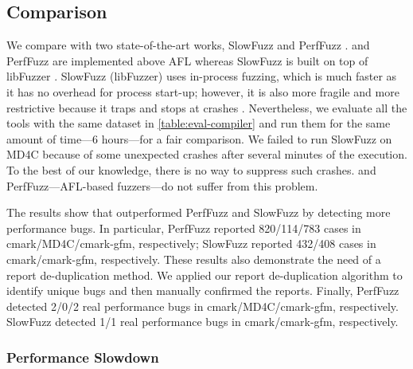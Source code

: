 
\subsection{Comparison}
\label{s:comparison}
We compare \sys with two state-of-the-art works, SlowFuzz \cite{slowfuzz} and PerfFuzz \cite{perffuzz}.
%
\sys and PerfFuzz are implemented above AFL whereas SlowFuzz is built on top of libFuzzer \cite{libfuzzer}.
%
SlowFuzz (libFuzzer) uses in-process fuzzing, which is much faster as it has no overhead for process start-up; however, it is also more fragile and more restrictive because it traps and stops at crashes \cite{libfuzzer}.
%
Nevertheless, 
we evaluate all the tools with the same dataset in \autoref{table:eval-compiler} and run them for the same amount of time---6 hours---for a fair comparison.
%
We failed to run SlowFuzz on MD4C because of some unexpected crashes after several minutes of the execution.
%
To the best of our knowledge, there is no way to suppress such crashes.
%
\sys and PerfFuzz---AFL-based fuzzers---do not suffer from this problem.
%

The results show that \sys outperformed PerfFuzz and SlowFuzz by detecting more performance bugs.
%
In particular, PerfFuzz reported 820/114/783 cases in cmark/MD4C/cmark-gfm, respectively;
%
SlowFuzz reported 432/408 cases in cmark/cmark-gfm, respectively.
%
These results also demonstrate the need of a report de-duplication method.
%
We applied our report de-duplication algorithm to identify unique bugs and then manually confirmed the reports.
%
Finally, PerfFuzz detected 2/0/2 real performance bugs in cmark/MD4C/cmark-gfm, respectively.
%
SlowFuzz detected 1/1 real performance bugs in cmark/cmark-gfm, respectively.


\subsubsection{Performance Slowdown}
\label{s:eval-slowdown}

